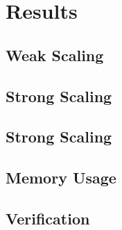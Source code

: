 \section{Results}

\subsection{Weak Scaling}



\subsection{Strong Scaling}



\subsection{Strong Scaling}

\subsection{Memory Usage}

\subsection{Verification}


